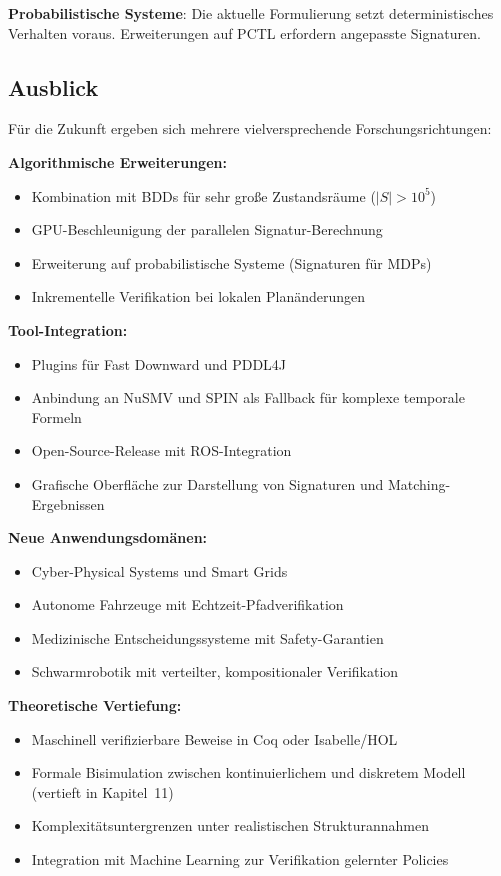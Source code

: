 ﻿\documentclass[a4paper,12pt]{article}
\theoremstyle{definition}
\begin{document}
\textbf{Probabilistische Systeme}: Die aktuelle Formulierung setzt deterministisches Verhalten voraus. Erweiterungen auf PCTL erfordern angepasste Signaturen.

\subsection{Ausblick}

Für die Zukunft ergeben sich mehrere vielversprechende Forschungsrichtungen:

\textbf{Algorithmische Erweiterungen:}
\begin{itemize}
	\item[-] Kombination mit BDDs für sehr große Zustandsräume ($|S| > 10^5$)
	\item[-] GPU-Beschleunigung der parallelen Signatur-Berechnung
	\item[-] Erweiterung auf probabilistische Systeme (Signaturen für MDPs)
	\item[-] Inkrementelle Verifikation bei lokalen Planänderungen
\end{itemize}

\textbf{Tool-Integration:}
\begin{itemize}
	\item[-] Plugins für Fast Downward und PDDL4J
	\item[-] Anbindung an NuSMV und SPIN als Fallback
	      für komplexe temporale Formeln
	\item[-] Open-Source-Release mit ROS-Integration
	\item[-] Grafische Oberfläche zur Darstellung
	      von Signaturen und Matching-Ergebnissen
\end{itemize}

\textbf{Neue Anwendungsdomänen:}
\begin{itemize}
	\item[-] Cyber-Physical Systems und Smart Grids
	\item[-] Autonome Fahrzeuge mit Echtzeit-Pfadverifikation
	\item[-] Medizinische Entscheidungssysteme mit Safety-Garantien
	\item[-] Schwarmrobotik mit verteilter, kompositionaler Verifikation
\end{itemize}

\textbf{Theoretische Vertiefung:}
\begin{itemize}
	\item[-] Maschinell verifizierbare Beweise in Coq oder Isabelle/HOL
	\item[-] Formale Bisimulation zwischen kontinuierlichem und diskretem Modell (vertieft in Kapitel~11)
	\item[-] Komplexitätsuntergrenzen unter realistischen Strukturannahmen
	\item[-] Integration mit Machine Learning zur Verifikation gelernter Policies
\end{itemize}
\end{document}
